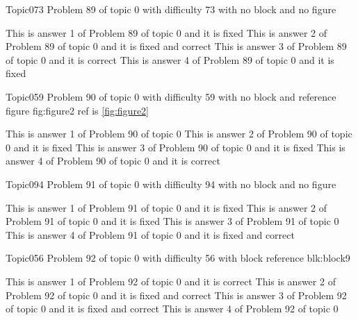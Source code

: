 \documentclass[master]{exam}
\begin{document}
\begin{problem}{Topic0}{73}
	Problem 89 of topic 0 with difficulty 73 with no block and no figure
	\begin{answers}
		\answer[fixed] This is answer 1 of Problem 89 of topic 0 and it is fixed
		 This is answer 2 of Problem 89 of topic 0 and it is fixed and correct
		\answer[correct] This is answer 3 of Problem 89 of topic 0 and it is correct
		\answer[fixed] This is answer 4 of Problem 89 of topic 0 and it is fixed
	\end{answers}
\end{problem}

\begin{problem}{Topic0}{59}
	Problem 90 of topic 0 with difficulty 59 with no block and reference figure fig:figure2 ref is \ref{fig:figure2}
	\begin{answers}
		\answer This is answer 1 of Problem 90 of topic 0 
		\answer[fixed] This is answer 2 of Problem 90 of topic 0 and it is fixed
		\answer[fixed] This is answer 3 of Problem 90 of topic 0 and it is fixed
		\answer[correct] This is answer 4 of Problem 90 of topic 0 and it is correct
	\end{answers}
\end{problem}

\begin{problem}{Topic0}{94}
	Problem 91 of topic 0 with difficulty 94 with no block and no figure
	\begin{answers}
		\answer[fixed] This is answer 1 of Problem 91 of topic 0 and it is fixed
		\answer[fixed] This is answer 2 of Problem 91 of topic 0 and it is fixed
		\answer This is answer 3 of Problem 91 of topic 0 
		 This is answer 4 of Problem 91 of topic 0 and it is fixed and correct
	\end{answers}
\end{problem}

\begin{problem}[requires=blk:block9]{Topic0}{56}
	Problem 92 of topic 0 with difficulty 56 with block reference blk:block9
	\begin{answers}
		\answer[correct] This is answer 1 of Problem 92 of topic 0 and it is correct
		 This is answer 2 of Problem 92 of topic 0 and it is fixed and correct
		 This is answer 3 of Problem 92 of topic 0 and it is fixed and correct
		\answer This is answer 4 of Problem 92 of topic 0 
	\end{answers}
\end{problem}
\end{document}
